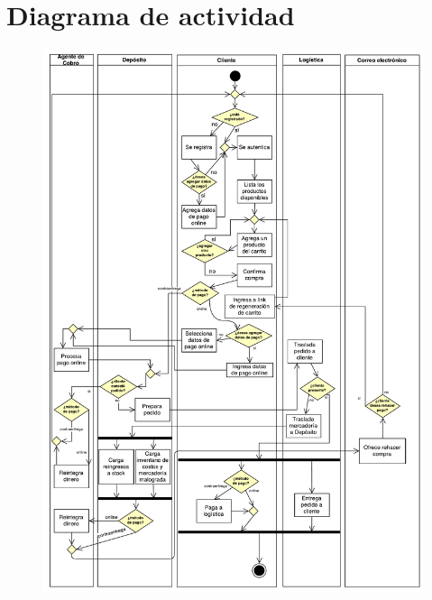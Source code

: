 \section{Diagrama de actividad}

\begin{figure}[H]
  \begin{center}
  \includegraphics[width=\textwidth]{tp2/images/actividad-compra.pdf}
  \end{center}
\end{figure}
